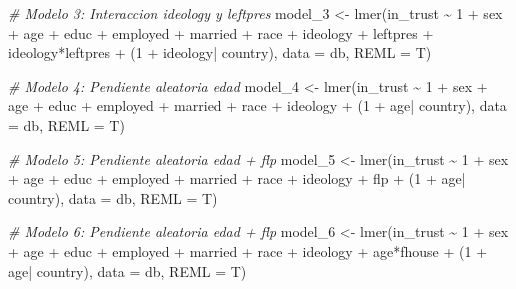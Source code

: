 \documentclass[
  12pt,
  a4paper,
]{article}
\newenvironment{Shaded}{\begin{snugshade}}{\end{snugshade}}
\newcommand{\AttributeTok}[1]{\textcolor[rgb]{0.77,0.63,0.00}{#1}}
\newcommand{\CommentTok}[1]{\textcolor[rgb]{0.56,0.35,0.01}{\textit{#1}}}
\newcommand{\DecValTok}[1]{\textcolor[rgb]{0.00,0.00,0.81}{#1}}
\newcommand{\FunctionTok}[1]{\textcolor[rgb]{0.00,0.00,0.00}{#1}}
\newcommand{\NormalTok}[1]{#1}
\newcommand{\OtherTok}[1]{\textcolor[rgb]{0.56,0.35,0.01}{#1}}
\newcommand{\SpecialCharTok}[1]{\textcolor[rgb]{0.00,0.00,0.00}{#1}}
\begin{document}
\begin{Shaded}
\begin{Highlighting}[]
\CommentTok{\# Modelo 3: Interaccion ideology y leftpres}
\NormalTok{model\_3 }\OtherTok{\textless{}{-}} \FunctionTok{lmer}\NormalTok{(in\_trust }\SpecialCharTok{\textasciitilde{}} \DecValTok{1} \SpecialCharTok{+}\NormalTok{ sex }\SpecialCharTok{+}\NormalTok{ age }\SpecialCharTok{+}\NormalTok{ educ }\SpecialCharTok{+}\NormalTok{ employed }\SpecialCharTok{+}\NormalTok{ married }\SpecialCharTok{+}
\NormalTok{                race }\SpecialCharTok{+}\NormalTok{ ideology }\SpecialCharTok{+}\NormalTok{ leftpres }\SpecialCharTok{+}\NormalTok{ ideology}\SpecialCharTok{*}\NormalTok{leftpres }\SpecialCharTok{+} 
\NormalTok{                (}\DecValTok{1} \SpecialCharTok{+}\NormalTok{ ideology}\SpecialCharTok{|}\NormalTok{ country),}
                \AttributeTok{data =}\NormalTok{ db, }
                \AttributeTok{REML =}\NormalTok{ T)}

\CommentTok{\# Modelo 4: Pendiente aleatoria edad}
\NormalTok{model\_4 }\OtherTok{\textless{}{-}} \FunctionTok{lmer}\NormalTok{(in\_trust }\SpecialCharTok{\textasciitilde{}} \DecValTok{1} \SpecialCharTok{+}\NormalTok{ sex }\SpecialCharTok{+}\NormalTok{ age }\SpecialCharTok{+}\NormalTok{ educ }\SpecialCharTok{+}\NormalTok{ employed }\SpecialCharTok{+}\NormalTok{ married }\SpecialCharTok{+}
\NormalTok{                race }\SpecialCharTok{+}\NormalTok{ ideology }\SpecialCharTok{+}\NormalTok{ (}\DecValTok{1} \SpecialCharTok{+}\NormalTok{ age}\SpecialCharTok{|}\NormalTok{ country),}
                \AttributeTok{data =}\NormalTok{ db, }
                \AttributeTok{REML =}\NormalTok{ T)}

\CommentTok{\# Modelo 5: Pendiente aleatoria edad + flp}
\NormalTok{model\_5 }\OtherTok{\textless{}{-}} \FunctionTok{lmer}\NormalTok{(in\_trust }\SpecialCharTok{\textasciitilde{}} \DecValTok{1} \SpecialCharTok{+}\NormalTok{ sex }\SpecialCharTok{+}\NormalTok{ age }\SpecialCharTok{+}\NormalTok{ educ }\SpecialCharTok{+}\NormalTok{ employed }\SpecialCharTok{+}\NormalTok{ married }\SpecialCharTok{+}
\NormalTok{                race }\SpecialCharTok{+}\NormalTok{ ideology }\SpecialCharTok{+}\NormalTok{ flp }\SpecialCharTok{+}\NormalTok{ (}\DecValTok{1} \SpecialCharTok{+}\NormalTok{ age}\SpecialCharTok{|}\NormalTok{ country),}
                \AttributeTok{data =}\NormalTok{ db, }
                \AttributeTok{REML =}\NormalTok{ T)}

\CommentTok{\# Modelo 6: Pendiente aleatoria edad + flp}
\NormalTok{model\_6 }\OtherTok{\textless{}{-}} \FunctionTok{lmer}\NormalTok{(in\_trust }\SpecialCharTok{\textasciitilde{}} \DecValTok{1} \SpecialCharTok{+}\NormalTok{ sex }\SpecialCharTok{+}\NormalTok{ age }\SpecialCharTok{+}\NormalTok{ educ }\SpecialCharTok{+}\NormalTok{ employed }\SpecialCharTok{+}\NormalTok{ married }\SpecialCharTok{+}
\NormalTok{                race }\SpecialCharTok{+}\NormalTok{ ideology }\SpecialCharTok{+}\NormalTok{ age}\SpecialCharTok{*}\NormalTok{fhouse }\SpecialCharTok{+}\NormalTok{ (}\DecValTok{1} \SpecialCharTok{+}\NormalTok{ age}\SpecialCharTok{|}\NormalTok{ country),}
                \AttributeTok{data =}\NormalTok{ db, }
                \AttributeTok{REML =}\NormalTok{ T)}



\end{Highlighting}
\end{Shaded}
\end{document}
